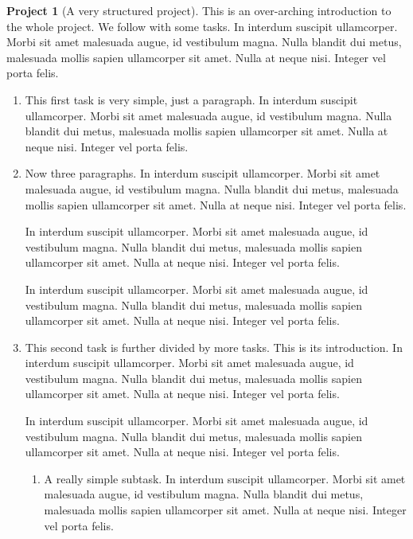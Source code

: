 \documentclass[10pt,]{article}
\theoremstyle{plain}
\theoremstyle{definition}
\theoremstyle{definition}
\theoremstyle{definition}
\theoremstyle{definition}
\newtheorem{project}{Project}[section]
\theoremstyle{definition}
\theoremstyle{definition}
\numberwithin{equation}{section}
\begin{document}
\begin{project}[A very structured project]\label{project-structured}
\hypertarget{p-79}{}%
This is an over-arching introduction to the whole project.  We follow with some tasks.  In interdum suscipit ullamcorper. Morbi sit amet malesuada augue, id vestibulum magna. Nulla blandit dui metus, malesuada mollis sapien ullamcorper sit amet. Nulla at neque nisi. Integer vel porta felis.%
\begin{enumerate}[font=\bfseries,label=(\alph*),ref=\alph*]
\item\label{task-1} \hypertarget{p-80}{}%
This first task is very simple, just a paragraph.  In interdum suscipit ullamcorper. Morbi sit amet malesuada augue, id vestibulum magna. Nulla blandit dui metus, malesuada mollis sapien ullamcorper sit amet. Nulla at neque nisi. Integer vel porta felis.%
\item\label{task-2} \hypertarget{p-81}{}%
Now three paragraphs.  In interdum suscipit ullamcorper. Morbi sit amet malesuada augue, id vestibulum magna. Nulla blandit dui metus, malesuada mollis sapien ullamcorper sit amet. Nulla at neque nisi. Integer vel porta felis.%
\par
\hypertarget{p-82}{}%
In interdum suscipit ullamcorper. Morbi sit amet malesuada augue, id vestibulum magna. Nulla blandit dui metus, malesuada mollis sapien ullamcorper sit amet. Nulla at neque nisi. Integer vel porta felis.%
\par
\hypertarget{p-83}{}%
In interdum suscipit ullamcorper. Morbi sit amet malesuada augue, id vestibulum magna. Nulla blandit dui metus, malesuada mollis sapien ullamcorper sit amet. Nulla at neque nisi. Integer vel porta felis.%
\item\label{task-3} \hypertarget{p-84}{}%
This second task is further divided by more tasks.  This is its introduction.  In interdum suscipit ullamcorper. Morbi sit amet malesuada augue, id vestibulum magna. Nulla blandit dui metus, malesuada mollis sapien ullamcorper sit amet. Nulla at neque nisi. Integer vel porta felis.%
\par
\hypertarget{p-85}{}%
In interdum suscipit ullamcorper. Morbi sit amet malesuada augue, id vestibulum magna. Nulla blandit dui metus, malesuada mollis sapien ullamcorper sit amet. Nulla at neque nisi. Integer vel porta felis.%
\begin{enumerate}[font=\bfseries,label=(\roman*),ref=\theenumi.\roman*]
\item\label{task-4} \hypertarget{p-86}{}%
A really simple subtask.  In interdum suscipit ullamcorper. Morbi sit amet malesuada augue, id vestibulum magna. Nulla blandit dui metus, malesuada mollis sapien ullamcorper sit amet. Nulla at neque nisi. Integer vel porta felis.%

\end{enumerate}
\end{enumerate}
\end{project}
\end{document}
